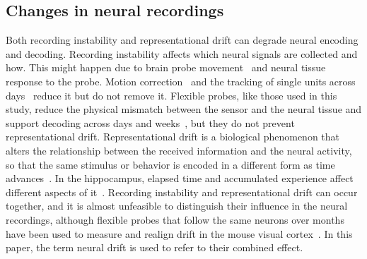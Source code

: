 \documentclass{article}
\begin{document}
\subsection{Changes in neural recordings}
Both recording instability and representational drift can degrade neural encoding and decoding. Recording instability affects which neural signals are collected and how. This might happen due to brain probe movement~\cite{tang2023a,steinmetz2021} and neural tissue response to the probe. Motion correction~\cite{windolf2025,garcia2024} and the tracking of single units across days~\cite{vanbeest2025,yuan2024} reduce it but do not remove it. Flexible probes, like those used in this study, reduce the physical mismatch between the sensor and the neural tissue and support decoding across days and weeks~\cite{tang2023a,tian2026}, but they do not prevent representational drift. Representational drift is a biological phenomenon that alters the relationship between the received information and the neural activity, so that the same stimulus or behavior is encoded in a different form as time advances~\cite{deitch2021,rule2019a,driscoll2022}. In the hippocampus, elapsed time and accumulated experience affect different aspects of it~\cite{geva2023}. Recording instability and representational drift can occur together, and it is almost unfeasible to distinguish their influence in the neural recordings, although flexible probes that follow the same neurons over months have been used to measure and realign drift in the mouse visual cortex~\cite{zhao2024}. In this paper, the term neural drift is used to refer to their combined effect.
\end{document}
